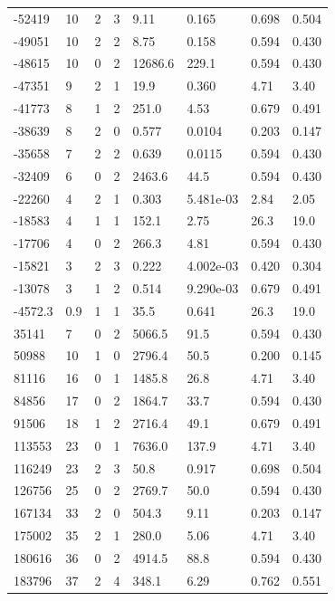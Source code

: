 \documentclass[preview]{standalone}
\begin{document}
{{\begin{tabular}{L{1.2cm}C{1.2cm} C{0.3cm}C{0.5cm} C{1.4cm}C{1.4cm} C{1.4cm}C{1.4cm}}
  -52419  &    10  & 2     &  3 &  9.11  & 0.165  & 0.698 &  0.504   \\ 
  -49051  &    10  & 2     &  2 &  8.75  & 0.158  & 0.594 &  0.430   \\ 
  -48615  &    10  & 0     &  2 &  12686.6  & 229.1  & 0.594 &  0.430   \\ 
  -47351  &     9  & 2     &  1 &  19.9  & 0.360  & 4.71 &  3.40   \\ 
  -41773  &     8  & 1     &  2 &  251.0  & 4.53  & 0.679 &  0.491   \\ 
  -38639  &     8  & 2     &  0 &  0.577  & 0.0104  & 0.203 &  0.147   \\ 
  -35658  &     7  & 2     &  2 &  0.639  & 0.0115  & 0.594 &  0.430   \\ 
  -32409  &     6  & 0     &  2 &  2463.6  & 44.5  & 0.594 &  0.430   \\ 
  -22260  &     4  & 2     &  1 &  0.303  & 5.481e-03  & 2.84 &  2.05   \\ 
  -18583  &     4  & 1     &  1 &  152.1  & 2.75  & 26.3 &  19.0   \\ 
  -17706  &     4  & 0     &  2 &  266.3  & 4.81  & 0.594 &  0.430   \\ 
  -15821  &     3  & 2     &  3 &  0.222  & 4.002e-03  & 0.420 &  0.304   \\ 
  -13078  &     3  & 1     &  2 &  0.514  & 9.290e-03  & 0.679 &  0.491   \\ 
  -4572.3  &   0.9  & 1     &  1 &  35.5  & 0.641  & 26.3 &  19.0   \\ 
  35141  &     7  & 0     &  2 &  5066.5  & 91.5  & 0.594 &  0.430   \\ 
  50988  &    10  & 1     &  0 &  2796.4  & 50.5  & 0.200 &  0.145   \\ 
  81116  &    16  & 0     &  1 &  1485.8  & 26.8  & 4.71 &  3.40   \\ 
  84856  &    17  & 0     &  2 &  1864.7  & 33.7  & 0.594 &  0.430   \\ 
  91506  &    18  & 1     &  2 &  2716.4  & 49.1  & 0.679 &  0.491   \\ 
  113553  &    23  & 0     &  1 &  7636.0  & 137.9  & 4.71 &  3.40   \\ 
  116249  &    23  & 2     &  3 &  50.8  & 0.917  & 0.698 &  0.504   \\ 
  126756  &    25  & 0     &  2 &  2769.7  & 50.0  & 0.594 &  0.430   \\ 
  167134  &    33  & 2     &  0 &  504.3  & 9.11  & 0.203 &  0.147   \\ 
  175002  &    35  & 2     &  1 &  280.0  & 5.06  & 4.71 &  3.40   \\ 
  180616  &    36  & 0     &  2 &  4914.5  & 88.8  & 0.594 &  0.430   \\ 
  183796  &    37  & 2     &  4 &  348.1  & 6.29  & 0.762 &  0.551   \\ 
\hline 
\end{tabular} 

}}
\end{document}
